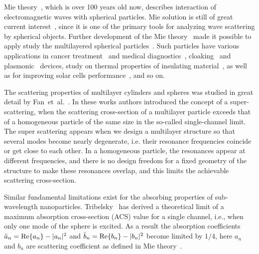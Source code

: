 \documentclass[aps,prl,twocolumn,showpacs,superscriptaddress,groupedaddress]{revtex4-1}
\begin{document}
\maketitle %

Mie theory~\cite{Mie-1908}, which is over 100 years old now, describes
interaction of electromagnetic waves with spherical particles. Mie
solution is still of great current interest~\cite{Suzuki-2008,MacKowski-2012,Lerme-2000,Xu-2005,Li-2006,Gogoi-2010,Santiago-2011},
since it is one of the primary tools for analyzing wave scattering by
spherical objects. Further development of the Mie
theory~\cite{Yang-2003, Pena-scattnlay-2009} made it possible to apply
study the multilayered spherical
particles~\cite{Sheehan-2013,Selmke-2012}.  Such particles have
various applications in cancer treatment~\cite{Zhang-2010,
  Hirsch-2003} and medical diagnostics~\cite{Allain-2002},
cloaking~\cite{Qui-2009, Semouchkina-2013, Ladutenko-2014} and
plasmonic~\cite{Martin-2013, Alu-2005} devices, study on thermal
properties of insulating material~\cite{Xie-2013}, as well as for
improving solar cells performance~\cite{Kameya-2011,Mann-2011}, and so
on.

The scattering properties of multilayer cylinders and spheres was
studied in great detail by Fan~et~al.~\cite{Fan-2010,Fan-2011}.  In these
works authors introduced the concept of a super-scattering, when the
scattering cross-section of a multilayer particle exceeds that of a
homogeneous particle of the same size in the so-called single-channel
limit. The super scattering appears when we design a multilayer
structure so that several modes become nearly degenerate, i.e. their
resonance frequencies coincide or get close to each other. In a
homogeneous particle, the resonances appear at different frequencies,
and there is no design freedom for a fixed geometry of the structure
to make these resonances overlap, and this limits the achievable
scattering cross-section.

Similar fundamental limitations exist for the absorbing properties of
sub-wavelength nanoparticles.  Tribelsky~\cite{Tribelsky-2011} has derived a
theoretical limit of a maximum absorption cross-section (ACS) value
for a single channel, i.e., when only one mode of the sphere is
excited.  As a result the absorption coefficients $\tilde{a}_n= {\rm
  Re}\{a_n\} - |a_n|^2 $ and $\tilde{b}_n= {\rm Re}\{b_n\} - |b_n|^2 $
become limited by $1/4$, here $a_n$ and $b_n$ are scattering
coefficient as defined in Mie theory~\cite{Bohren-1983}.
\end{document}
